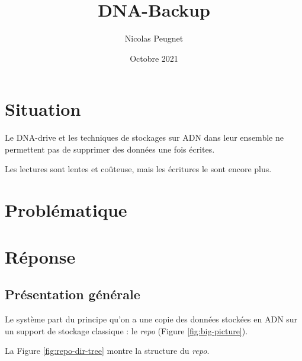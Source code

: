 \documentclass[a4paper,twocolumn]{article}
\title{DNA-Backup}
\date{Octobre 2021}
\author{Nicolas Peugnet}
\begin{document}
\maketitle

\tableofcontents

\section{Situation}

Le DNA-drive et les techniques de stockages sur ADN dans leur ensemble ne permettent pas de supprimer des données une fois écrites.

Les lectures sont lentes et coûteuse, mais les écritures le sont encore plus.

\section{Problématique}
\section{Réponse}

\subsection{Présentation générale}


Le système part du principe qu'on a une copie des données stockées en
ADN sur un support de stockage classique : le \emph{repo} (Figure \ref{fig:big-picture}).
\begin{figure*}[ht]
\centering


\caption{Schéma global}
\label{fig:big-picture}
\end{figure*}

La Figure \ref{fig:repo-dir-tree} montre la structure du \emph{repo}. 
\end{document}
